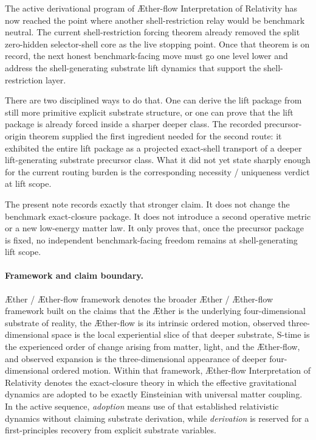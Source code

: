 \documentclass[11pt]{article}
\newcommand{\Aether}{\AE{}ther}
\newcommand{\Aflow}{\AE{}ther-flow}
\newcommand{\TheoryName}{\Aflow{} Interpretation of Relativity}
\newcommand{\TheoryProgram}{\Aether{} / \Aflow{} framework}
\begin{document}
The active derivational program of \TheoryName{} has now reached the point where another shell-restriction relay would be benchmark neutral. The current shell-restriction forcing theorem already removed the split zero-hidden selector-shell core as the live stopping point. Once that theorem is on record, the next honest benchmark-facing move must go one level lower and address the shell-generating substrate lift dynamics that support the shell-restriction layer.

There are two disciplined ways to do that. One can derive the lift package from still more primitive explicit substrate structure, or one can prove that the lift package is already forced inside a sharper deeper class. The recorded precursor-origin theorem supplied the first ingredient needed for the second route: it exhibited the entire lift package as a projected exact-shell transport of a deeper lift-generating substrate precursor class. What it did not yet state sharply enough for the current routing burden is the corresponding necessity / uniqueness verdict at lift scope.

The present note records exactly that stronger claim. It does not change the benchmark exact-closure package. It does not introduce a second operative metric or a new low-energy matter law. It only proves that, once the precursor package is fixed, no independent benchmark-facing freedom remains at shell-generating lift scope.

\paragraph{Framework and claim boundary.}
\TheoryProgram{} denotes the broader \Aether{} / \Aflow{} framework built on the claims that the \Aether{} is the underlying four-dimensional substrate of reality, the \Aflow{} is its intrinsic ordered motion, observed three-dimensional space is the local experiential slice of that deeper substrate, S-time is the experienced order of change arising from matter, light, and the \Aflow{}, and observed expansion is the three-dimensional appearance of deeper four-dimensional ordered motion. Within that framework, \TheoryName{} denotes the exact-closure theory in which the effective gravitational dynamics are adopted to be exactly Einsteinian with universal matter coupling. In the active sequence, \emph{adoption} means use of that established relativistic dynamics without claiming substrate derivation, while \emph{derivation} is reserved for a first-principles recovery from explicit substrate variables.
\end{document}
